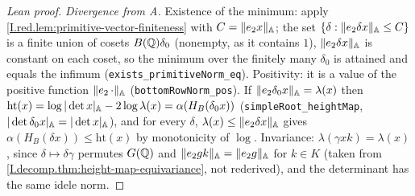 \begin{proof}[Lean proof]
\emph{Divergence from A.} Existence of the minimum: apply \cref{I.red.lem:primitive-vector-finiteness} with $C=\lVert e_2x\rVert_{\mathbb{A}}$; the set $\{\delta:\lVert e_2\delta x\rVert_{\mathbb{A}}\le C\}$ is a finite union of cosets $B(\mathbb{Q})\delta_0$ (nonempty, as it contains $1$), $\lVert e_2\delta x\rVert_{\mathbb{A}}$ is constant on each coset, so the minimum over the finitely many $\delta_0$ is attained and equals the infimum (\texttt{exists\_primitiveNorm\_eq}). Positivity: it is a value of the positive function $\lVert e_2\,\cdot\rVert_{\mathbb{A}}$ (\texttt{bottomRowNorm\_pos}). If $\lVert e_2\delta_0x\rVert_{\mathbb{A}}=\lambda(x)$ then $\mathrm{ht}(x)=\log|\det x|_{\mathbb{A}}-2\log\lambda(x)=\alpha(H_B(\delta_0x))$ (\texttt{simpleRoot\_heightMap}, $|\det\delta_0x|_{\mathbb{A}}=|\det x|_{\mathbb{A}}$), and for every $\delta$, $\lambda(x)\le\lVert e_2\delta x\rVert_{\mathbb{A}}$ gives $\alpha(H_B(\delta x))\le\mathrm{ht}(x)$ by monotonicity of $\log$. Invariance: $\lambda(\gamma xk)=\lambda(x)$, since $\delta\mapsto\delta\gamma$ permutes $G(\mathbb{Q})$ and $\lVert e_2gk\rVert_{\mathbb{A}}=\lVert e_2g\rVert_{\mathbb{A}}$ for $k\in K$ (taken from \cref{I.decomp.thm:height-map-equivariance}, not rederived), and the determinant has the same idele norm.
\end{proof}

